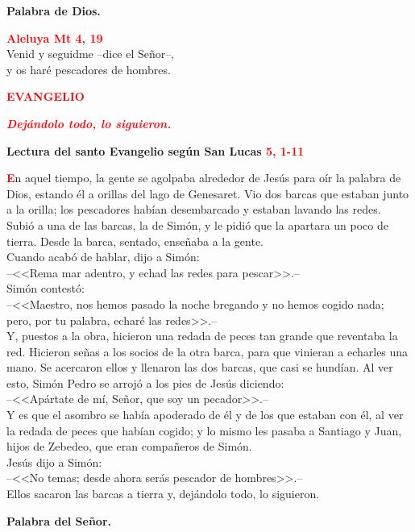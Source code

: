 \documentclass[12pt, letterpaper]{report}
\begin{document}
    {\bfseries Palabra de Dios.}

    \begin{center}
    \Large {\bfseries \textcolor{red}{Aleluya \hspace{1cm} Mt 4, 19}}\\
    Venid y seguidme --dice el Se\~nor--,\\
    y os har\'e pescadores de hombres.
    \end{center}

    \begin{center}
    \Large {\bfseries \textcolor{red}{EVANGELIO}}
    \end{center}

    \begin{center}
    \large {\bfseries \textit{ \textcolor{red}{Dej\'andolo todo, lo siguieron.}}}
    \end{center}

    \Huge \textcolor{red}{} \Large {\bfseries Lectura del santo Evangelio seg\'un San Lucas \hspace{1cm} \textcolor{red}{5, 1-11}}

    \lettrine[lines=2]{\bfseries \textcolor{red}{E}}{}\Large n aquel tiempo, la gente se agolpaba alrededor de Jes\'us para o\'ir la palabra de Dios, estando \'el a orillas del lago de Genesaret. Vio dos barcas que estaban junto a la orilla; los pescadores hab\'ian desembarcado y estaban lavando las redes.\\
    Subi\'o a una de las barcas, la de Sim\'on, y le pidi\'o que la apartara un poco de tierra. Desde la barca, sentado, ense\~naba a la gente.\\
    Cuando acab\'o de hablar, dijo a Sim\'on:\\
    --<<Rema mar adentro, y echad las redes para pescar>>.--\\
    Sim\'on contest\'o:\\
    --<<Maestro, nos hemos pasado la noche bregando y no hemos cogido nada; pero, por tu palabra, echar\'e las redes>>.--\\
    Y, puestos a la obra, hicieron una redada de peces tan grande que reventaba la red. Hicieron se\~nas a los socios de la otra barca, para que vinieran a echarles una mano. Se acercaron ellos y llenaron las dos barcas, que casi se hund\'ian. Al ver esto, Sim\'on Pedro se arroj\'o a los pies de Jes\'us diciendo:\\
    --<<Ap\'artate de m\'i, Se\~nor, que soy un pecador>>.--\\
    Y es que el asombro se hab\'ia apoderado de \'el y de los que estaban con \'el, al ver la redada de peces que hab\'ian cogido; y lo mismo les pasaba a Santiago y Juan, hijos de Zebedeo, que eran compa\~neros de Sim\'on.\\
    Jes\'us dijo a Sim\'on:\\
    --<<No temas; desde ahora ser\'as pescador de hombres>>.--\\
    Ellos sacaron las barcas a tierra y, dej\'andolo todo, lo siguieron.

    {\bfseries Palabra del Se\~nor.}
\end{document}
